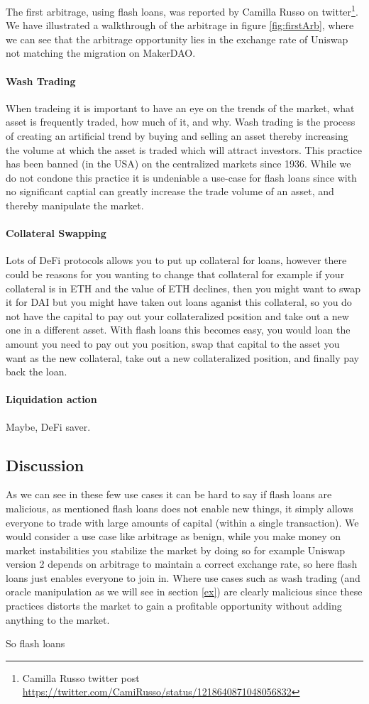 The first arbitrage, using flash loans, was reported by Camilla Russo
on twitter\footnote{Camilla Russo twitter post
  \url{https://twitter.com/CamiRusso/status/1218640871048056832}}. We
have illustrated a walkthrough of the arbitrage in figure
\ref{fig:firstArb}, where we can see that the arbitrage opportunity
lies in the exchange rate of Uniswap not matching the migration on
MakerDAO.

\paragraph{Wash Trading} When tradeing it is important to have an eye
on the trends of the market, what asset is frequently traded, how much
of it, and why. Wash trading is the process of creating an artificial
trend by buying and selling an asset thereby increasing the volume at
which the asset is traded which will attract investors. This practice
has been banned (in the USA) on the centralized markets since
1936. While we do not condone this practice it is undeniable a
use-case for flash loans since with no significant captial can greatly
increase the trade volume of an asset, and thereby manipulate the
market.

\paragraph{Collateral Swapping} Lots of DeFi protocols allows you to
put up collateral for loans, however there could be reasons for you
wanting to change that collateral for example if your collateral is in
ETH and the value of ETH declines, then you might want to swap it for
DAI but you might have taken out loans aganist this collateral, so you
do not have the capital to pay out your collateralized position and
take out a new one in a different asset. With flash loans this becomes
easy, you would loan the amount you need to pay out you position, swap
that capital to the asset you want as the new collateral, take out a
new collateralized position, and finally pay back the loan.

\paragraph{Liquidation action} Maybe, DeFi saver.

\subsection{Discussion}
As we can see in these few use cases it can be hard to say if flash
loans are malicious, as mentioned flash loans does not enable new
things, it simply allows everyone to trade with large amounts of
capital (within a single transaction). We would consider a use case
like arbitrage as benign, while you make money on market instabilities
you stabilize the market by doing so for example Uniswap version 2
depends on arbitrage to maintain a correct exchange rate, so here
flash loans just enables everyone to join in. Where use cases such as
wash trading (and oracle manipulation as we will see in section
\ref{ex}) are clearly malicious since these practices distorts the
market to gain a profitable opportunity without adding anything to the
market.

So flash loans 